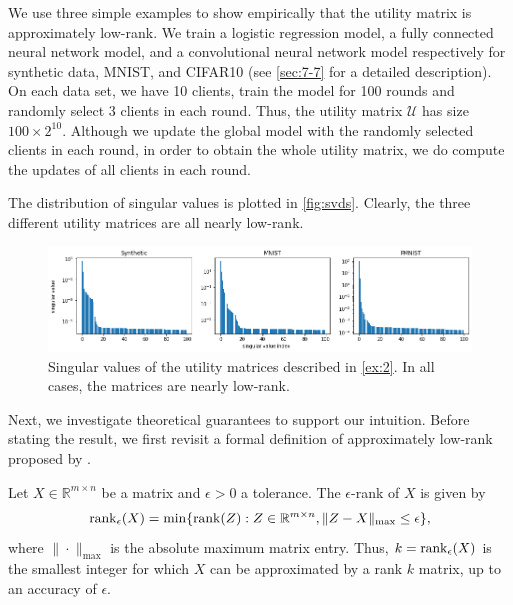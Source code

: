 \begin{example} \label{ex:2}
    We use three simple examples to show empirically that the utility matrix is approximately low-rank.  We train a logistic regression model, a fully connected neural network model, and a convolutional neural network model respectively for synthetic data, MNIST, and CIFAR10 (see \autoref{sec:7-7} for a detailed description). On each data set, we have 10 clients, train the model for 100 rounds and randomly select 3 clients in each round. Thus, the utility matrix $\mathcal{U}$ has size $100\times 2^{10}$. Although we update the global model with the randomly selected clients in each round, in order to obtain the whole utility matrix, we do compute the updates of all clients in each round.
    
    The distribution of singular values is plotted in \autoref{fig:svds}. Clearly, the three different utility matrices are all nearly low-rank.

    \begin{figure}[t]
        \centering
        \includegraphics[width=\textwidth]{./figures/svds.png}
        \caption{Singular values of the utility matrices described in \autoref{ex:2}. In all cases, the matrices are nearly low-rank.}
        \label{fig:svds}
    \end{figure}

\end{example}

Next, we investigate theoretical guarantees to support our intuition. Before stating the result, we first revisit a formal definition of approximately low-rank proposed by \citet{udell2019big}. 
\begin{definition} \label{def:epsilon-rank}
    Let $X\in\mathbb{R}^{m\times n}$ be a matrix and $\epsilon>0$ a tolerance. The $\epsilon$-rank of $X$ is given by 
    \[\operatorname{rank}_{\epsilon}(X) = \min\{\operatorname{rank}(Z): Z\in\mathbb{R}^{m\times n}, \|Z - X\|_{\max} \leq \epsilon\},\]
    where $\|\cdot\|_{\max}$ is the absolute maximum matrix entry. Thus, $k = \operatorname{rank}_{\epsilon} (X)$ is the smallest integer for which $X$ can be approximated by a rank $k$ matrix, up to an accuracy of $\epsilon$.
\end{definition}

